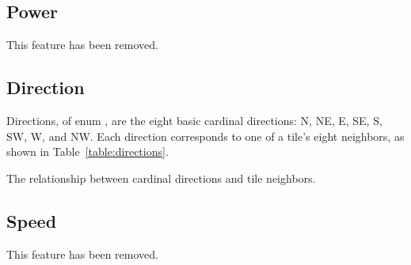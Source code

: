 \documentclass{pset}
\newcommand{\removed}{This feature has been removed.}
\begin{document}
\ifx \POWER \undefined \else
\subsection{Power}
\removed{}
\fi

\ifx \DIRECTION \undefined \else
\subsection{Direction}
Directions, of enum , are the eight basic cardinal directions:
N, NE, E, SE, S, SW, W, and NW\@. Each direction corresponds to one of a tile's
eight neighbors, as shown in Table~\ref{table:directions}.

\begin{table}[H]
  \centering
  \caption{The relationship between cardinal directions and tile neighbors.}
  \label{table:directions}
\end{table}
\fi

\ifx \SPEED \undefined \else
\subsection{Speed}
\removed{}
\fi

\end{document}
